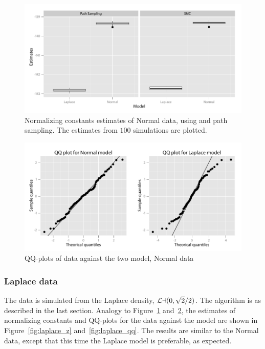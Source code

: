 \begin{figure}[htb]
  \centering
  \includegraphics{fig/5-nz}
  \caption{Normalizing constants estimates of Normal data, using \smc and
    path sampling. The estimates from $100$ simulations are plotted.}
  \label{fig:normal_z}
\end{figure}

\begin{figure}[htb]
  \centering
  \includegraphics{fig/5-nqq}
  \caption{QQ-plots of data against the two model, Normal data}
  \label{fig:normal_qq}
\end{figure}

\subsubsection{Laplace data}

The data is simulated from the Laplace density, $\mathcal{La}(0, \sqrt{2}/2)$. The
algorithm is as described in the last section. Analogy to
Figure~\ref{fig:normal_z} and~\ref{fig:normal_qq}, the estimates of
normalizing constants and QQ-plots for the data against the model are shown
in Figure~\ref{fig:laplace_z} and~\ref{fig:laplace_qq}. The results are
similar to the Normal data, except that this time the Laplace model is
preferable, as expected.

